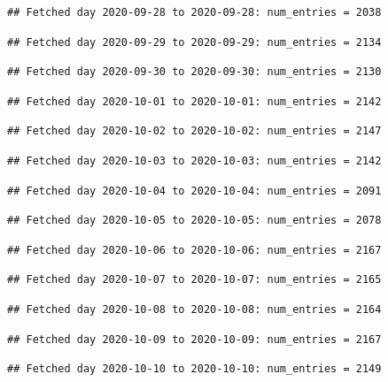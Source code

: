 \documentclass[]{article}
\begin{document}
\begin{verbatim}
## Fetched day 2020-09-28 to 2020-09-28: num_entries = 2038
\end{verbatim}

\begin{verbatim}
## Fetched day 2020-09-29 to 2020-09-29: num_entries = 2134
\end{verbatim}

\begin{verbatim}
## Fetched day 2020-09-30 to 2020-09-30: num_entries = 2130
\end{verbatim}

\begin{verbatim}
## Fetched day 2020-10-01 to 2020-10-01: num_entries = 2142
\end{verbatim}

\begin{verbatim}
## Fetched day 2020-10-02 to 2020-10-02: num_entries = 2147
\end{verbatim}

\begin{verbatim}
## Fetched day 2020-10-03 to 2020-10-03: num_entries = 2142
\end{verbatim}

\begin{verbatim}
## Fetched day 2020-10-04 to 2020-10-04: num_entries = 2091
\end{verbatim}

\begin{verbatim}
## Fetched day 2020-10-05 to 2020-10-05: num_entries = 2078
\end{verbatim}

\begin{verbatim}
## Fetched day 2020-10-06 to 2020-10-06: num_entries = 2167
\end{verbatim}

\begin{verbatim}
## Fetched day 2020-10-07 to 2020-10-07: num_entries = 2165
\end{verbatim}

\begin{verbatim}
## Fetched day 2020-10-08 to 2020-10-08: num_entries = 2164
\end{verbatim}

\begin{verbatim}
## Fetched day 2020-10-09 to 2020-10-09: num_entries = 2167
\end{verbatim}

\begin{verbatim}
## Fetched day 2020-10-10 to 2020-10-10: num_entries = 2149
\end{verbatim}
\end{document}
